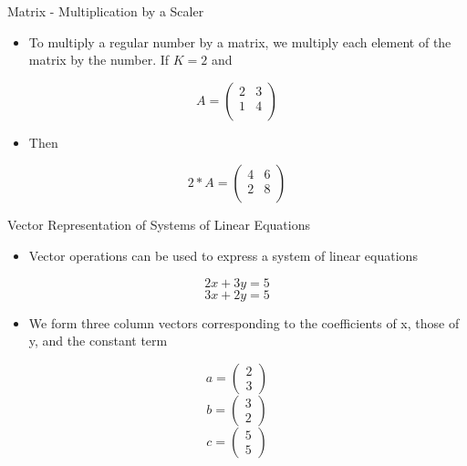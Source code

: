 \documentclass[
  ignorenonframetext,
]{beamer}
\providecommand{\tightlist}{%
  \setlength{\itemsep}{0pt}\setlength{\parskip}{0pt}}
\begin{document}
\begin{frame}{Matrix - Multiplication by a Scaler}
\protect\hypertarget{matrix---multiplication-by-a-scaler}{}

\begin{itemize}
\tightlist
\item
  To multiply a regular number by a matrix, we multiply each element of
  the matrix by the number. If \(K=2\) and
\end{itemize}

\[ A= \begin{pmatrix}
  2 & 3  \\
  1 & 4  \\
 \end{pmatrix}\]

\begin{itemize}
\tightlist
\item
  Then
\end{itemize}

\[ 2*A= \begin{pmatrix}
  4 & 6  \\
  2 & 8  \\
 \end{pmatrix}\]

\end{frame}

\begin{frame}{Vector Representation of Systems of Linear Equations}
\protect\hypertarget{vector-representation-of-systems-of-linear-equations}{}

\begin{itemize}
\tightlist
\item
  Vector operations can be used to express a system of linear equations
\end{itemize}

\[2x+3y = 5\] \[3x+2y = 5\]

\begin{itemize}
\tightlist
\item
  We form three column vectors corresponding to the coefficients of x,
  those of y, and the constant term
\end{itemize}

\[a = \begin{pmatrix} 2 \\ 3 \end{pmatrix}\]
\[b = \begin{pmatrix} 3 \\ 2 \end{pmatrix}\]
\[c = \begin{pmatrix} 5 \\ 5 \end{pmatrix}\]

\end{frame}
\end{document}
